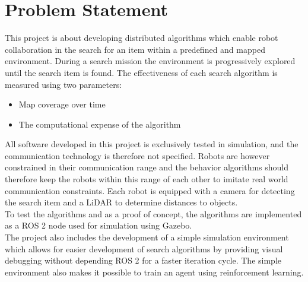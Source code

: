 \section{Problem Statement}
\label{sec:problem-statement}

This project is about developing distributed algorithms which enable robot collaboration in the search for an item within a predefined and mapped environment. During a search mission the environment is progressively explored until the search item is found. The effectiveness of each search algorithm is measured using two parameters:

\begin{itemize}
    \item Map coverage over time
    \item The computational expense of the algorithm
\end{itemize}

All software developed in this project is exclusively tested in simulation, and the communication technology is therefore not specified. Robots are however constrained in their communication range and the behavior algorithms should therefore keep the robots within this range of each other to imitate real world communication {\color{red} constraints}. Each robot is equipped with a camera for detecting the search item and a LiDAR to determine distances to objects. \\

To test the algorithms and as a proof of concept, the algorithms are implemented as a ROS 2 node used for simulation using Gazebo. \\

The project also includes the development of a simple simulation environment which allows for easier development of search algorithms by providing visual debugging without depending ROS 2 for a faster iteration cycle. The simple environment also makes it possible to train an agent using reinforcement learning.
